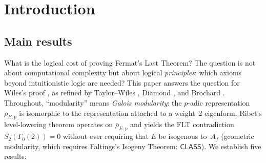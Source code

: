 \documentclass[11pt]{article}
\theoremstyle{plain}
\theoremstyle{definition}
\theoremstyle{remark}
\newcommand{\CLASS}{\mathsf{CLASS}}
\begin{document}
\tableofcontents

\section{Introduction}\label{sec:intro}

\subsection{Main results}

What is the logical cost of proving Fermat's Last Theorem?
The question is not about computational complexity but about logical
\emph{principles}: which axioms beyond intuitionistic logic are
needed?  This paper answers the question for Wiles's proof
\cite{Wiles1995}, as refined by Taylor--Wiles \cite{TaylorWiles1995},
Diamond \cite{Diamond1997}, and Brochard \cite{Brochard2017}.
Throughout, ``modularity'' means \emph{Galois modularity}: the
$p$-adic representation $\rho_{E,p}$ is isomorphic to the
representation attached to a weight~2 eigenform.  Ribet's
level-lowering theorem operates on $\bar{\rho}_{E,p}$ and yields the
FLT contradiction $S_2(\Gamma_0(2)) = 0$ without ever requiring
that $E$ be isogenous to~$A_f$ (geometric modularity, which
requires Faltings's Isogeny Theorem: $\CLASS$).
We establish five results:
\end{document}
